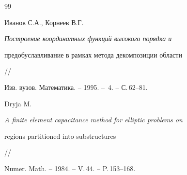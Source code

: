 \begin{thebibliography}{99}


Иванов С.А., Корнеев В.Г.


{\em Построение координатных функций высокого порядка и


предобуславливание в рамках метода декомпозиции области} //


Изв. вузов. Математика. -- 1995. -- \No\,4. -- С.\,62--81. 




Dryja M. {\em A finite element capacitance method for elliptic problems on


regions partitioned into substructures} //


Numer. Math. -- 1984. -- V.\,44. -- P.\,153--168.





\end{thebibliography}





\vskip 2cm









\smallskip









\label{end}





